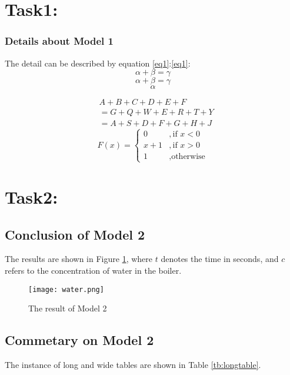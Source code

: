 \documentclass[12pt]{article}  %
\begin{document}
\section{Task1:}
\subsubsection{Details about Model 1}
The detail can be described by equation \eqref{eq1}:\autoref{eq1}:
\begin{equation}\label{eq1}
\alpha+\beta=\gamma
\end{equation}
\[
\alpha+\beta=\gamma
\]
$$\alpha$$


\begin{equation}\label{eq2}
	\begin{split}
	&A+B+C+D+E+F\\
	&=G+Q+W+E+R+T+Y\\
	&=A+S+D+F+G+H+J
	\end{split}
\end{equation}
\begin{equation}\label{eq3}
	F(x)=
	\begin{cases}
		0&,\text{if $x<0$}\\
		x+1&,\text{if $x>0$}\\
		1&,\text{otherwise}
			\end{cases}
\end{equation}

\section{Task2:}
\subsection{Conclusion of Model 2}
The results are shown in Figure \ref{fig:result}, where $t$ denotes the time in seconds, and $c$ refers to the concentration of water in the boiler.

\begin{figure}[htbp]
\centering
\texttt{[image: water.png]}
\caption{The result of Model 2}\label{fig:result}
\end{figure}

\clearpage
\subsection{Commetary on Model 2}
The instance of long and wide tables are shown in Table \ref{tb:longtable}.
\end{document}
